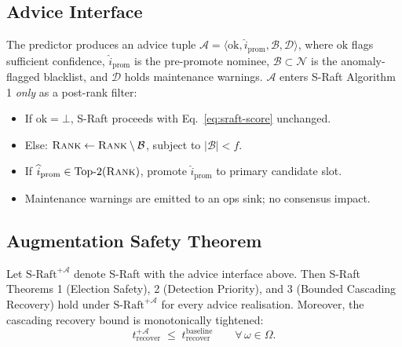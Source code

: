 \subsection{Advice Interface}

The predictor produces an advice tuple
$\mathcal{A}=\langle \text{ok},\widehat{i}_{\text{prom}},\mathcal{B},\mathcal{D}\rangle$,
where $\text{ok}$ flags sufficient confidence, $\widehat{i}_{\text{prom}}$ is
the pre-promote nominee, $\mathcal{B}\subset\mathcal{N}$ is the
anomaly-flagged blacklist, and $\mathcal{D}$ holds maintenance warnings.
$\mathcal{A}$ enters S-Raft Algorithm 1 \emph{only} as a post-rank filter:
\begin{itemize}\setlength\itemsep{1pt}
  \item If $\text{ok}=\bot$, S-Raft proceeds with Eq.~\eqref{eq:sraft-score} unchanged.
  \item Else: $\textsc{Rank}\leftarrow\textsc{Rank}\setminus\mathcal{B}$,
        subject to $|\mathcal{B}|<f$.
  \item If $\widehat{i}_{\text{prom}}\in\text{Top-2}(\textsc{Rank})$,
        promote $\widehat{i}_{\text{prom}}$ to primary candidate slot.
  \item Maintenance warnings are emitted to an ops sink; no consensus impact.
\end{itemize}

\subsection{Augmentation Safety Theorem}
\label{sec:safety}

\begin{theorem}
\label{thm:safety}
Let $\mathrm{S\text{-}Raft}^{+\mathcal{A}}$ denote S-Raft with the advice
interface above. Then S-Raft Theorems 1 (Election Safety), 2 (Detection
Priority), and 3 (Bounded Cascading Recovery) hold under
$\mathrm{S\text{-}Raft}^{+\mathcal{A}}$ for every advice realisation.
Moreover, the cascading recovery bound is monotonically tightened:
\begin{equation}
  \label{eq:recovery-bound}
  t_{\mathrm{recover}}^{+\mathcal{A}} \;\le\;
  t_{\mathrm{recover}}^{\mathrm{baseline}}
  \qquad \forall\,\omega \in \Omega.
\end{equation}
\end{theorem}

